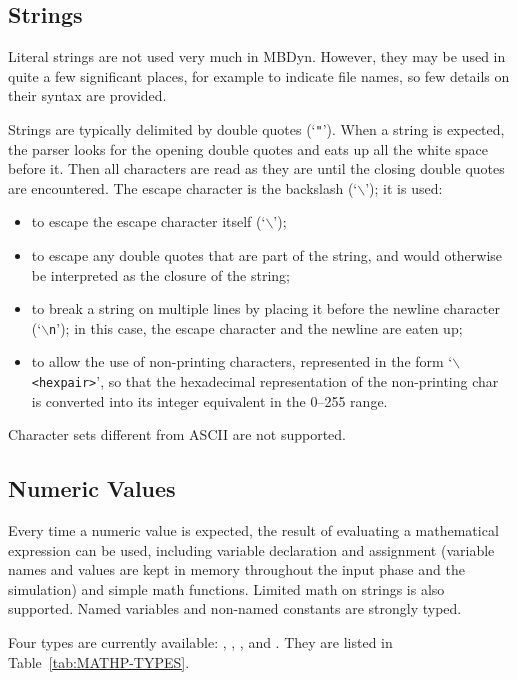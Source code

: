 \subsection{Strings}
Literal strings are not used very much in MBDyn.
However, they may be used in quite a few significant places,
for example to indicate file names, so few details on their syntax
are provided.

Strings are typically delimited by double quotes (`\texttt{"}').
When a string is expected, the parser looks for the opening 
double quotes and eats up all the white space before it.
Then all characters are read as they are until the closing 
double quotes are encountered.
The escape character is the backslash (`$\backslash$'); it is used:
\begin{itemize}
	\item to escape the escape character itself (`$\backslash$');
	\item to escape any double quotes that are part of the string,
		and would otherwise be interpreted as the closure
		of the string;
	\item to break a string on multiple lines by placing it
		before the newline character (`\texttt{$\backslash$n}');
		in this case, the escape character and the newline
		are eaten up;
	\item to allow the use of non-printing characters,
		represented in the form `\texttt{$\backslash$<hexpair>}',
		so that the hexadecimal representation of the
		non-printing char is converted into its integer
		equivalent in the 0--255 range.
\end{itemize}
Character sets different from ASCII are not supported.



\subsection{Numeric Values}
Every time a numeric value is expected, the result of evaluating 
a mathematical expression can be used, including variable declaration 
and assignment (variable names and values are kept in memory throughout
the input phase and the simulation) and simple math functions.
Limited math on strings is also supported.
Named variables and non-named constants are strongly typed.

Four types are currently available: , , , and .
They are listed in Table~\ref{tab:MATHP-TYPES}.

